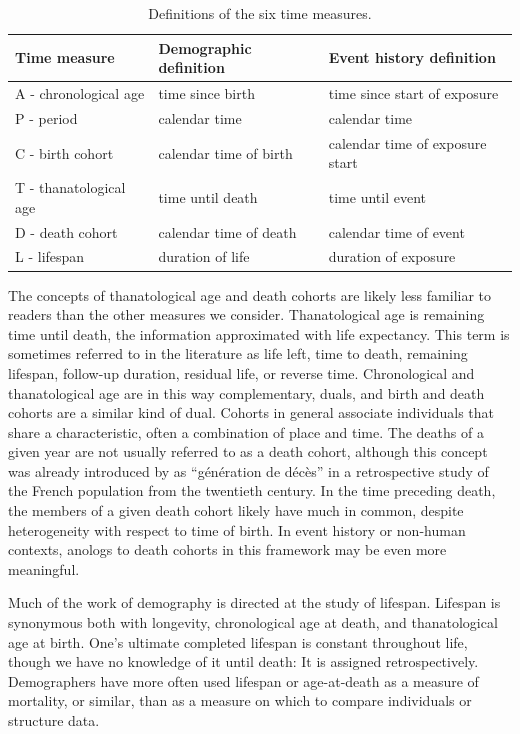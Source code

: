 \documentclass[12pt,oneside,a4paper,doublespacing]{article} %
\theoremstyle{definition}
\begin{document}
\FloatBarrier
\begin{table}[ht!]
\centering
\caption{Definitions of the six time measures.}
\label{tab:sixdefs}
\begin{adjustwidth}{0em}{0em}
\begin{tabular}{lll}
\hline 
\textbf{Time measure}	& \textbf{Demographic definition}	& \textbf{Event history definition}	\\ \hline 
A - chronological age 	& time since birth 			& time since start of exposure 		\\
P - period 		        & calendar time 			& calendar time				\\
C - birth cohort 	    & calendar time of birth 	& calendar time of exposure
start
\\
T - thanatological age 	& time until death 			& time until event			\\
D - death cohort	    & calendar time of death	& calendar time of event		\\
L - lifespan		    & duration of life			& duration of exposure			\\ \hline
\end{tabular}
\end{adjustwidth}
\end{table}

The concepts of thanatological age and death cohorts are likely less familiar to
readers than the other measures we consider. Thanatological age is
remaining time until death, the information approximated with life
expectancy. This term is sometimes referred to in the literature as life left,
time to death, remaining lifespan, follow-up duration, residual life, or
reverse time. Chronological and thanatological age are in this way
complementary, duals, and birth and death cohorts are a similar kind of dual.
Cohorts in general associate individuals that share a characteristic, often a combination of place and time. The deaths of a given year are not usually referred to as a death
cohort, although this concept was already introduced by \cite{brouard1986} as
``g\'en\'eration de d\'ec\`es'' in a retrospective study of the French
population from the twentieth century. In the time preceding death, the members of a given death cohort likely have much in common, despite heterogeneity with respect to time of birth. In event history or non-human contexts, anologs to death cohorts in this framework may be even more meaningful.

Much of the work of demography is directed at the study of lifespan. Lifespan is
synonymous both with longevity, chronological age at death, and thanatological
age at birth. One's ultimate completed lifespan is constant throughout life,
though we have no knowledge of it until death: It is assigned retrospectively.
Demographers have more often used lifespan or age-at-death as a measure of
mortality, or similar, than as a measure on which to compare individuals or
structure data.
\end{document}
